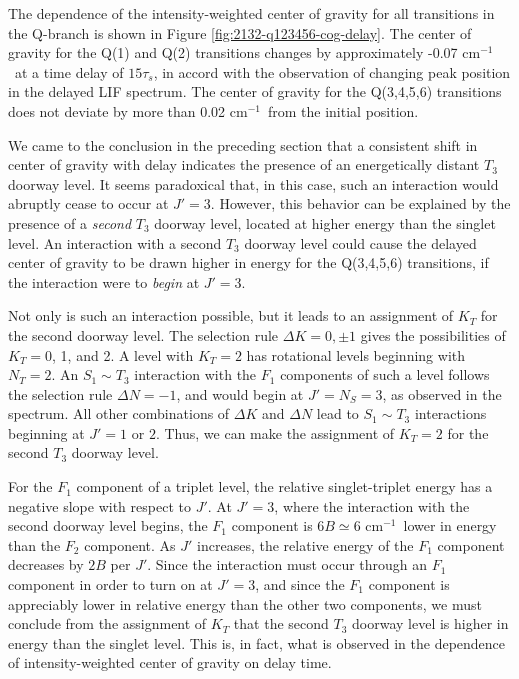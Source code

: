 \documentclass[12pt]{mitthesis}
\newcommand{\rcm}{cm$^{-1}$}
\begin{document}
The dependence of the intensity-weighted center of gravity for all
transitions in the Q-branch is shown in Figure
\ref{fig:2132-q123456-cog-delay}.  The center of gravity for the Q(1)
and Q(2) transitions changes by approximately -0.07 \rcm\ at a time
delay of $15\tau_s$, in accord with the observation of changing peak
position in the delayed LIF spectrum.  The center of gravity for the
Q(3,4,5,6) transitions does not deviate by more than 0.02 \rcm\ from
the initial position.

We came to the conclusion in the preceding section that a consistent
shift in center of gravity with delay indicates the presence of an
energetically distant $T_3$ doorway level.  It seems paradoxical that,
in this case, such an interaction would abruptly cease to occur at
$J'=3$.  However, this behavior can be explained by the presence of a
\emph{second} $T_3$ doorway level, located at higher energy than the
singlet level.  An interaction with a second $T_3$ doorway level could
cause the delayed center of gravity to be drawn higher in energy for
the Q(3,4,5,6) transitions, if the interaction were to \emph{begin} at
$J'=3$.

Not only is such an interaction possible, but it leads to an
assignment of $K_T$ for the second doorway level.  The selection rule
$\Delta K = 0, \pm 1$ gives the possibilities of $K_T=$0, 1, and 2.  A
level with $K_T=2$ has rotational levels beginning with $N_T=2$.  An
$S_1 \sim T_3$ interaction with the $F_1$ components of such a level
follows the selection rule $\Delta N = -1$, and would begin at
$J'=N_S=3$, as observed in the spectrum.  All other combinations of
$\Delta K$ and $\Delta N$ lead to $S_1 \sim T_3$ interactions
beginning at $J'=1$ or $2$.  Thus, we can make the assignment of
$K_T=2$ for the second $T_3$ doorway level.

For the $F_1$ component of a triplet level, the relative
singlet-triplet energy has a negative slope with respect to $J'$.  At
$J'=3$, where the interaction with the second doorway level begins,
the $F_1$ component is $6B \simeq 6$ \rcm\ lower in energy than the
$F_2$ component.  As $J'$ increases, the relative energy of the $F_1$
component decreases by $2B$ per $J'$.  Since the interaction must
occur through an $F_1$ component in order to turn on at $J'=3$, and
since the $F_1$ component is appreciably lower in relative energy than
the other two components, we must conclude from the assignment of
$K_T$ that the second $T_3$ doorway level is higher in energy than the
singlet level.  This is, in fact, what is observed in the dependence
of intensity-weighted center of gravity on delay time.
\end{document}
